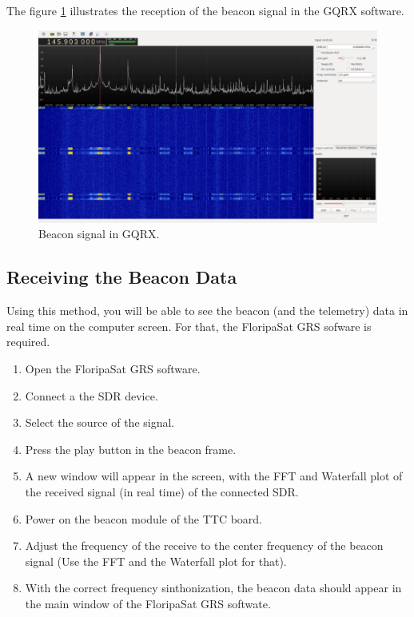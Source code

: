 The figure \ref{fig:beacon-signal-gqrx} illustrates the reception of the beacon signal in the GQRX software.

\begin{figure}[!h]
	\begin{center}
		\includegraphics[width=\textwidth]{figures/beacon-signal-gqrx.png}
		\caption{Beacon signal in GQRX.}
		\label{fig:beacon-signal-gqrx}
	\end{center}
\end{figure}

\subsection{Receiving the Beacon Data}

Using this method, you will be able to see the beacon (and the telemetry) data in real time on the computer screen. For that, the FloripaSat GRS sofware is required.

\begin{enumerate}
    \item Open the FloripaSat GRS software.
    \item Connect a the SDR device.
    \item Select the source of the signal.
    \item Press the play button in the beacon frame.
    \item A new window will appear in the screen, with the FFT and Waterfall plot of the received signal (in real time) of the connected SDR.
    \item Power on the beacon module of the TTC board.
    \item Adjust the frequency of the receive to the center frequency of the beacon signal (Use the FFT and the Waterfall plot for that).
    \item With the correct frequency sinthonization, the beacon data should appear in the main window of the FloripaSat GRS softwate.
\end{enumerate}

